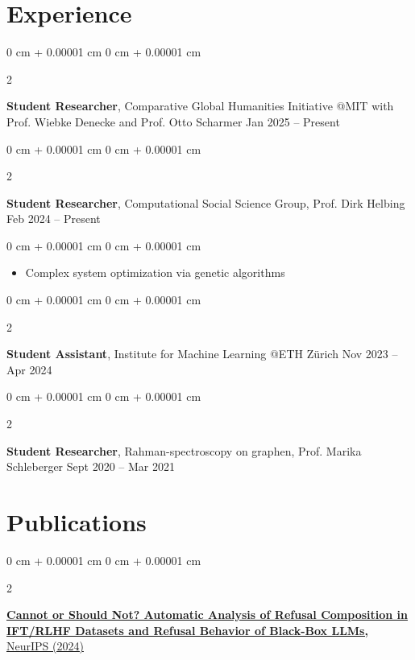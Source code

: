 \documentclass[10pt, letterpaper]{article}
\newenvironment{highlights}{
    \begin{itemize}[
        topsep=0.10 cm,
        parsep=0.10 cm,
        partopsep=0pt,
        itemsep=0pt,
        leftmargin=0 cm + 10pt
    ]
}{
    \end{itemize}
}
\newenvironment{onecolentry}{
    \begin{adjustwidth}{
        0 cm + 0.00001 cm
    }{
        0 cm + 0.00001 cm
    }
}{
    \end{adjustwidth}
}
\newenvironment{twocolentry}[2][]{
    \onecolentry
    \def\secondColumn{#2}
    \setcolumnwidth{\fill, 4.5 cm}
    \begin{paracol}{2}
}{
    \switchcolumn \raggedleft \secondColumn
    \end{paracol}
    \endonecolentry
}
\begin{document}
    \section{Experience}
     \begin{twocolentry}{
            Jan 2025 – Present
        }
            \textbf{Student Researcher}, Comparative Global Humanities Initiative @MIT with Prof. Wiebke Denecke and Prof. Otto Scharmer\end{twocolentry}

        \vspace{0.10 cm}

        \begin{twocolentry}{
            Feb 2024 – Present
        }
            \textbf{Student Researcher}, Computational Social Science Group, Prof. Dirk Helbing\end{twocolentry}

        \vspace{0.10 cm}
        \begin{onecolentry}
            \begin{highlights}
                \item Complex system optimization via genetic algorithms
            \end{highlights}
        \end{onecolentry}

        \vspace{0.2 cm}

        \begin{twocolentry}{
            Nov 2023 – Apr 2024
        }
            \textbf{Student Assistant}, Institute for Machine Learning @ETH Zürich\end{twocolentry}

        \vspace{0.2 cm}

        \begin{twocolentry}{
            Sept 2020 – Mar 2021
        }
            \textbf{Student Researcher}, Rahman-spectroscopy on graphen, Prof. Marika Schleberger \end{twocolentry}

        \vspace{0.2 cm}

    \section{Publications}

        \begin{twocolentry}{
            2024
        }
        \href{https://arxiv.org/abs/2412.16974}{\textbf{Cannot or Should Not? Automatic Analysis of Refusal Composition in IFT/RLHF Datasets and Refusal Behavior of Black-Box LLMs,}} \href{https://neurips.cc/virtual/2024/105596}{NeurIPS  (2024)}\end{twocolentry}
\end{document}
